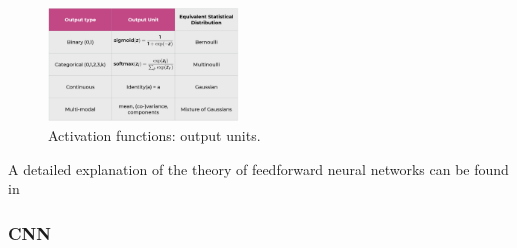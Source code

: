 \documentclass[letter,8pt]{article}\usepackage[]{graphicx}\usepackage[]{color}
\begin{document}
\begin{figure}
  \begin{center}
    \includegraphics[width=0.45\textwidth]{figure/activation_function_output.png}
      \end{center}
     \caption{Activation functions: output units. \cite[slide 24]{nnheca2019}}
     \label{fig:activation}
\end{figure}

A detailed explanation of the theory of feedforward neural networks can be found in \cite[Chapter 6]{Goodfellow-et-al-2016}


\subsubsection{CNN}
\end{document}
